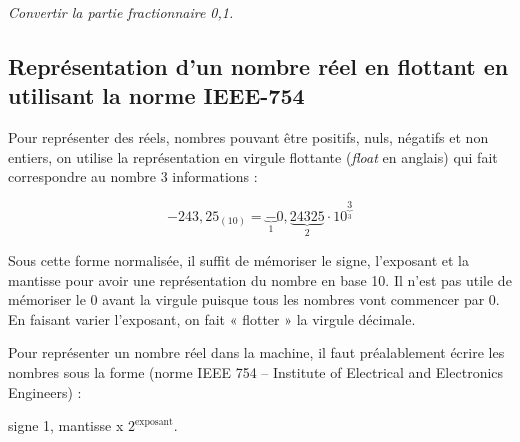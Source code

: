 %

\begin{exemple}
\textit{Convertir la partie fractionnaire 0,1.}
\end{exemple}

\subsection{Représentation d'un nombre réel en flottant en utilisant la norme IEEE-754}


Pour représenter des réels, nombres pouvant être positifs, nuls, négatifs et non entiers, on utilise la représentation en virgule flottante (\textit{float} en anglais) qui fait correspondre au nombre 3 informations :

$$
-243,25_{(10)} = \underbrace{-}_{1}0,\underbrace{24325}_{2}\cdot10^{\underbrace{3}_{3}}
$$

Sous cette forme normalisée, il suffit de mémoriser le signe, l’exposant et la mantisse pour avoir une représentation du nombre en base 10. Il n’est pas utile de mémoriser le 0 avant la virgule puisque tous les nombres vont commencer par 0. En faisant varier l’exposant, on fait « flotter » la virgule décimale.

Pour représenter un nombre réel dans la machine, il faut préalablement écrire les nombres sous la forme (norme IEEE 754 -- Institute of Electrical and Electronics Engineers) :

\begin{center}
signe 1, mantisse x $2^{\text{exposant}}$.
\end{center}



